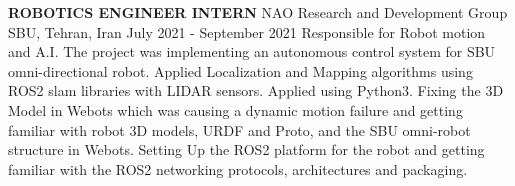 \begin{cventries}
    \cventry
    {\textbf{ROBOTICS ENGINEER INTERN}}
    {NAO Research and Development Group}
    {SBU, Tehran, Iran}
    {July 2021 - September 2021}
    {Responsible for Robot motion and A.I. 
    \newline The project was implementing an autonomous control system for SBU omni-directional robot. Applied Localization and Mapping algorithms using ROS2 slam libraries with LIDAR sensors. 
    \newline Applied  using Python3. 
    \newline Fixing the 3D Model in Webots which was causing a dynamic motion failure and getting familiar with robot 3D models, URDF and Proto, and the SBU omni-robot structure in Webots. 
    \newline Setting Up the ROS2 platform for the robot and getting familiar with the ROS2 networking protocols, architectures and packaging.}
\end{cventries}

